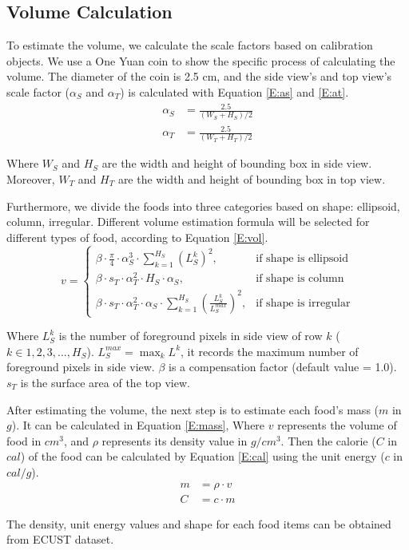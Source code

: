\documentclass[12pt, a4paper, twoside]{article}
\begin{document}
	\subsection{Volume Calculation}
	To estimate the volume\cite{vol}, we calculate the scale factors based on calibration objects. We use a One Yuan coin to show the specific process of calculating the volume. The diameter of the coin is 2.5 cm, and the side view’s and top view's scale factor ($\alpha_S$ and $\alpha_T$) is calculated with Equation \ref{E:as} and \ref{E:at}.
	\begin{align}
		\alpha_S &= \frac{2.5}{(W_S + H_S)/2} \label{E:as}\\
		\alpha_T &= \frac{2.5}{(W_T + H_T)/2 \label{E:at}}
	\end{align}
	\par
	Where $W_S$ and $H_S$ are the width and height of bounding box in side view. Moreover, $W_T$ and $H_T$ are the width and height of bounding box in top view.
	\par
	Furthermore, we divide the foods into three categories based on shape: ellipsoid, column, irregular. Different volume estimation formula will be selected for different types of food, according to Equation \ref{E:vol}. 
	\begin{equation}\label{E:vol}
		v = 
		\begin{cases}
			\beta \cdot \frac{\pi}{4} \cdot \alpha_S^3 \cdot \sum_{k=1}^{H_S} (L^k_S)^2, &\text{if shape is ellipsoid} \\
			\beta \cdot  s_T \cdot \alpha_T^2 \cdot H_S \cdot \alpha_S, &\text{if shape is column} \\
			\beta \cdot  s_T \cdot \alpha_T^2 \cdot \alpha_S \cdot \sum_{k=1}^{H_S} \left(\frac{L^k_S}{L_S^{max}}\right)^2, &\text{if shape is irregular} 
		\end{cases}
	\end{equation}
	\par
	Where $L^k_S$ is the number of foreground pixels in side view of row $k$ ($k \in 1, 2, 3, \dots , H_S$). $L^{max}_S = \max_{k} L^k$, it records the maximum number of foreground pixels in side view. $\beta$ is a compensation factor (default value = 1.0).  $s_T$ is the surface area of the top view.
	\par
	After estimating the volume, the next step is to estimate each food’s mass ($m$ in $g$). It can be calculated in Equation \ref{E:mass}, Where $v$ represents the volume of food in $cm^3$, and  $\rho$ represents its density value in $g/cm^3$. Then the calorie ($C$ in $cal$) of the food can be calculated by Equation \ref{E:cal} using the unit energy ($c$ in $cal/g$).
	\begin{align}
		m &= \rho \cdot v \label{E:mass} \\
		C &= c \cdot m \label{E:cal}
	\end{align}
	\par
	The density, unit energy values and shape for each food items can be obtained from ECUST dataset.
	
\end{document}
